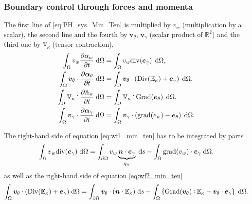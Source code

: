 \documentclass[preprint,12pt]{elsarticle}
\def\onedot{$\mathsurround0pt\ldotp$}
\def\cddot{%
	\mathbin{\vcenter{\baselineskip.67ex
			\hbox{\onedot}\hbox{\onedot}}%
}}
\begin{document}
\subsubsection{Boundary control through forces and momenta}
The first line of \eqref{eq:PH_sys_Min_Ten} is multiplied  by $v_w$ (multiplication by a scalar), the second line and the fourth by $\bm{v}_{\theta}$, $\bm{v}_{\gamma}$ (scalar product of $\mathbb{R}^2$) and the third one by $\mathbb{V}_{\kappa}$ (tensor contraction).
\begin{align}
\int_{\Omega} v_w \diffp{\alpha_w}{t}  \d\Omega &=  \int_{\Omega} v_w \mathrm{div}(\bm{e}_{\gamma}) \, \d\Omega,  \label{eq:wf1_min_ten}\\
\int_{\Omega} \bm{v}_{\theta} \cdot \diffp{\bm\alpha_{\theta}}{t}   \d\Omega &= \int_{\Omega} \bm{v}_{\theta} \cdot (\mathrm{Div}( \mathbb{E}_{\kappa}) + \bm{e}_{\gamma}) \,  \d\Omega,  \label{eq:wf2_min_ten} \\
\int_{\Omega} \mathbb{V}_{\kappa} \cddot \diffp{\mathbb{A}_{\kappa}}{t}   \d\Omega &= \int_{\Omega} \mathbb{V}_{\kappa} \cddot \mathrm{Grad}(\bm{e}_\theta) \, \d\Omega, \label{eq:wf3_min_ten} \\
\int_{\Omega} \bm{v}_{\gamma} \cdot \diffp{\bm\alpha_{\gamma}}{t}   \d\Omega &= \int_{\Omega} \bm{v}_{\gamma} \cdot (\mathrm{grad}({e}_{w}) - \bm{e}_{\theta}) \, \d\Omega.  \label{eq:wf4_min_ten}
\end{align}

The right-hand side of equation \eqref{eq:wf1_min_ten} has to be integrated by parts
\begin{equation}
\label{eq:line1_ten_min}
\int_{\Omega} v_w \mathrm{div}(\bm{e}_{\gamma})  \d\Omega = \int_{\partial \Omega} v_w \underbrace{\bm{n} \cdot \bm{e}_{\gamma}}_{q_n}  \d{s} - \int_{\Omega} \mathrm{grad}(v_w)  \cdot \bm{e}_{\gamma}  \d\Omega,\end{equation}
as well as the right-hand side of equation \eqref{eq:wf2_min_ten}
\begin{equation}
\label{eq:line2_ten_min}
\int_{\Omega} \bm{v}_{\theta} \cdot (\mathrm{Div}(\mathbb{E}_{\kappa}) + \bm{e}_{\gamma})  \d\Omega = \int_{\partial \Omega} \bm{v}_{\theta} \cdot (\bm{n} \cdot \mathbb{E}_{\kappa})  \d{s} -\int_{\Omega} \left\{ \mathrm{Grad}(\bm{v}_{\theta}) \cddot \mathbb{E}_{\kappa} - \bm{v}_{\theta} \cdot \bm{e}_{\gamma}\right\}  \d\Omega.
\end{equation}
\end{document}
